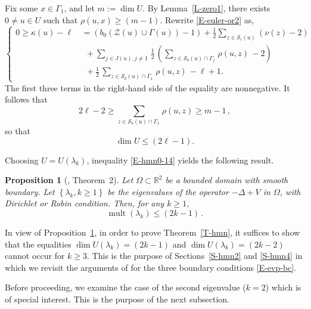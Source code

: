 \documentclass[12pt,a4paper]{amsart}
\theoremstyle{plain} %
\newtheorem{proposition}[theorem]{Proposition}
\theoremstyle{definition}
\numberwithin{equation}{section}
\numberwithin{figure}{section}
\numberwithin{table}{section}
\newcommand{\R}{\mathbb{R}}
\newcommand{\cS}{\mathcal{S}}
\newcommand{\cZ}{\mathcal{Z}}
\DeclareMathOperator{\mult}{mult}
\newcommand{\set}[1]{\left\lbrace #1 \right\rbrace}
\begin{document}
Fix some $x \in \Gamma_1$, and let $m := \dim U$. By Lemma~\ref{L-zero1}, there exists $0 \neq u \in U$ such that $\rho(u,x) \ge (m-1)$. Rewrite \eqref{E-euler-or2} as,
%
\begin{equation}\label{E-euler-or2a}
\left\{
\begin{array}{ll}
0 \geq  \kappa(u) - \ell  \,  & = \left( b_0(\cZ(u) \cup \Gamma(u))-1\right)+ \frac 12 \sum_{z \in \cS_i(u)} (\nu(z)-2)\\[5pt]
& ~~ + \sum_{j \in J(u), j\not = 1\,}  \frac 12 \, \left( \sum_{z\in \cS_b(u) \cap
\Gamma_j\,} \rho(u,z) \, - 2 \right)\\[5pt]
& ~~ + \frac 12 \, \sum_{z\in \cS_b(u) \cap \Gamma_1\,} \rho(u,z) \, - \ell + 1. \end{array}
\right.
\end{equation}
%
The first three terms in the right-hand side of the equality are nonnegative. It follows that
%
\begin{equation*}
2\ell - 2 \ge \sum_{z\in \cS_b(u) \cap \Gamma_1\,} \rho(u,z) \ge m-1\,,
\end{equation*}
%
so that
%
\begin{equation}\label{E-hmn0-14}
\dim U \le (2\ell - 1).
\end{equation}

Choosing $U = U(\lambda_k)$, inequality \eqref{E-hmn0-14} yields the following result.


\begin{proposition}[\cite{Nadi1987}, Theorem~2]\label{P-hmn-s1}
Let $\Omega \subset \R^2$ be a bounded domain with smooth boundary. Let $\set{\lambda_k, k\ge 1}$ be the eigenvalues of the operator $-\Delta + V$ in $\Omega$, with Dirichlet or Robin condition. Then, for any $k \ge 1$,
\begin{equation*}
\mult(\lambda_k) \le (2k-1)\,.
\end{equation*}
\end{proposition}%

In view of Proposition~\ref{P-hmn-s1}, in order to prove Theorem~\ref{T-hmn}, it suffices to show that the equalities $\dim U(\lambda_k) = (2k-1)$ and $\dim U(\lambda_k) = (2k-2)$ cannot occur for $k\ge 3$. This is the purpose of Sections~\ref{S-hmn2} and \ref{S-hmn4} in which we revisit the arguments of \cite{HoMN1999} for the three boundary conditions \eqref{E-evp-bc}.\smallskip


Before proceeding, we examine the case of the second eigenvalue ($k=2$) which is of special interest. This is the purpose of the next subsection.
\end{document}
